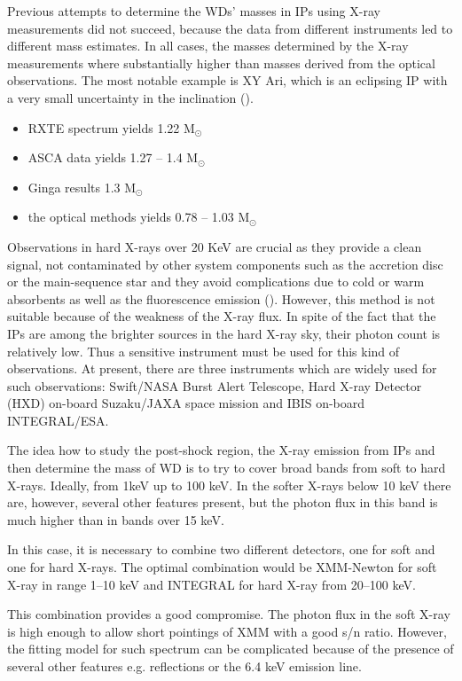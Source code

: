 \documentclass[oneside,a4paper,11pt]{report}
\begin{document}
Previous attempts to determine the WDs' masses in IPs using X-ray measurements did not succeed, 
because the data from different instruments led to different mass estimates. In all cases, the 
masses  determined by the X-ray measurements where substantially higher than masses derived from  the optical 
observations. The most notable example is XY Ari, which is an eclipsing IP with a very small uncertainty in 
the inclination (\citet{1998MNRAS.297.1269R}).          
\begin{itemize}
 \item RXTE spectrum yields 1.22 M$_\odot$
 \item ASCA data yields 1.27 -- 1.4 M$_\odot$
 \item Ginga results 1.3 M$_\odot$
 \item the optical methods yields 0.78 -- 1.03 M$_\odot$ 
\end{itemize}
Observations in hard X-rays over 20 KeV are crucial as they provide a clean signal, not contaminated 
by other system components such as the accretion disc or the main-sequence star and they avoid 
complications due to cold or warm absorbents as well as the fluorescence emission (\citet{2009A&A...496..121B}). 
However, this method is not suitable because of the weakness of the X-ray flux. In spite of the fact that the IPs 
are among the brighter sources in the hard X-ray sky, their photon count is relatively low. Thus a sensitive 
instrument must be used for this kind of observations. At present, there are three instruments which are 
widely used for such observations: Swift/NASA Burst Alert Telescope, Hard X-ray Detector
(HXD) on-board Suzaku/JAXA space mission and IBIS on-board INTEGRAL/ESA.

The idea how to study the post-shock region, the X-ray emission from IPs and then 
determine the mass of WD is to try to cover broad bands from soft to hard X-rays. Ideally, 
from 1keV up to 100 keV. In the softer X-rays below 10 keV there are, however, several other features 
present, but the photon flux in this band is much higher than in bands over 15 keV. 

In this case, it is necessary to combine two different detectors, one for soft and one 
for hard X-rays. The optimal combination would be XMM-Newton for soft X-ray in range 1–10 keV 
and INTEGRAL for hard X-ray from 20–100 keV. 

This combination provides a good compromise. The photon flux in the soft X-ray is high enough 
to allow short pointings of XMM with a good s/n ratio. However, the fitting model for such spectrum 
can be complicated because of the presence of several other features e.g. reflections or the 6.4 keV 
emission line.
\end{document}
